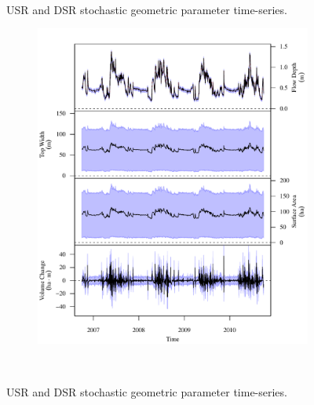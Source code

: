 \begin{linenumbers}
\begin{landscape}
\begin{figure}
\begin{subfigure}{0.7\textwidth}
		\end{subfigure}\\
		\caption[]{USR and DSR stochastic geometric parameter time-series.}
	\end{figure}
\end{landscape}
\subfiguremid
\begin{landscape}
	\begin{figure}
		\begin{subfigure}{0.7\textwidth}
			\centering
			\includegraphics[width=\tableCustomSize]{"Figures/Results_USR/Stochastic/G TS E"}
		\end{subfigure}\\
		\caption[]{USR and DSR stochastic geometric parameter time-series.}
	\end{figure}
\end{landscape}


\end{linenumbers}
